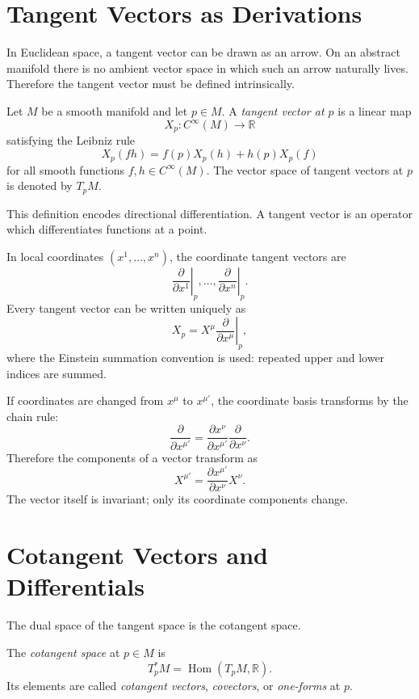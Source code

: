 \clearpage

\section{Tangent Vectors as Derivations}

In Euclidean space, a tangent vector can be drawn as an arrow. On an abstract
manifold there is no ambient vector space in which such an arrow naturally
lives. Therefore the tangent vector must be defined intrinsically.

\begin{definitionbox}
Let \(M\) be a smooth manifold and let \(p\in M\). A \emph{tangent vector at
\(p\)} is a linear map
\[
X_p:C^\infty(M)\to \mathbb{R}
\]
satisfying the Leibniz rule
\[
X_p(fh)=f(p)X_p(h)+h(p)X_p(f)
\]
for all smooth functions \(f,h\in C^\infty(M)\). The vector space of tangent
vectors at \(p\) is denoted by \(T_pM\).
\end{definitionbox}

This definition encodes directional differentiation. A tangent vector is an
operator which differentiates functions at a point.

In local coordinates \((x^1,\ldots,x^n)\), the coordinate tangent vectors are
\[
\left.\frac{\partial}{\partial x^1}\right|_p,
\ldots,
\left.\frac{\partial}{\partial x^n}\right|_p.
\]
Every tangent vector can be written uniquely as
\[
X_p=X^\mu\left.\frac{\partial}{\partial x^\mu}\right|_p,
\]
where the Einstein summation convention is used: repeated upper and lower
indices are summed.

If coordinates are changed from \(x^\mu\) to \(x^{\mu'}\), the coordinate basis
transforms by the chain rule:
\[
\frac{\partial}{\partial x^{\mu'}}
=
\frac{\partial x^\nu}{\partial x^{\mu'}}
\frac{\partial}{\partial x^\nu}.
\]
Therefore the components of a vector transform as
\[
X^{\mu'}=
\frac{\partial x^{\mu'}}{\partial x^\nu}X^\nu.
\]
The vector itself is invariant; only its coordinate components change.

\clearpage

\section{Cotangent Vectors and Differentials}

The dual space of the tangent space is the cotangent space.

\begin{definitionbox}
The \emph{cotangent space} at \(p\in M\) is
\[
T_p^*M=\operatorname{Hom}(T_pM,\mathbb{R}).
\]
Its elements are called \emph{cotangent vectors}, \emph{covectors}, or
\emph{one-forms} at \(p\).
\end{definitionbox}

